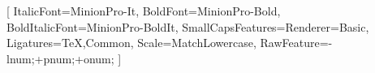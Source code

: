 \setmainfont{MinionPro}
		[
			ItalicFont={MinionPro-It},
			BoldFont={MinionPro-Bold},
			BoldItalicFont={MinionPro-BoldIt},
			SmallCapsFeatures={Renderer=Basic},
			Ligatures={TeX,Common},
			Scale=MatchLowercase,
			RawFeature=-lnum;+pnum;+onum;
		]
